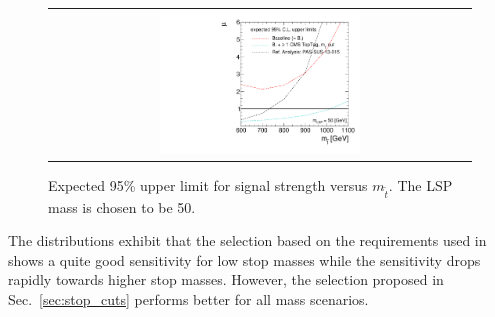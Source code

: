 \begin{figure}[!h]
  \centering
  \begin{tabular}{c}
                \includegraphics[width=0.49\textwidth]{figures/limitplot4BinSel_BaselineTopTagTransverseMassRef.pdf} 
  \end{tabular}
  \caption{Expected 95\% upper limit for signal strength versus $m_{\tilde{t}}$. The LSP mass is chosen to be 50\gev.}
  \label{fig:stop_baselinetoptagref_limit}
\end{figure}

The distributions exhibit that the selection based on the requirements used in~\cite{CMS-PAS-SUS-13-015} shows a quite good sensitivity for low stop masses while the sensitivity drops rapidly towards higher stop masses. However, the selection proposed in Sec.~\ref{sec:stop_cuts} performs better for all mass scenarios.  

 

